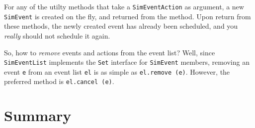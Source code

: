 For any of the utilty methods that take a \lstinline{SimEventAction}
  as argument, a new \lstinline{SimEvent} is created on the fly,
  and returned from the method.
Upon return from these methods,
  the newly created event has already been scheduled,
  and you {\em really\/} should not schedule it again.

So, how to {\em remove\/} events and actions from the event list?
Well, since \lstinline{SimEventList} implements the \lstinline{Set} interface for
  \lstinline{SimEvent} members, removing an event \lstinline{e}
  from an event list \lstinline{el} is as simple as
  \lstinline{el.remove (e)}.
However,
  the preferred method is \lstinline|el.cancel (e)|.

\section{Summary}

